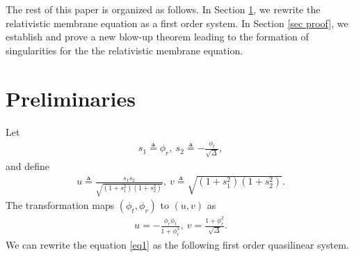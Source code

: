 \documentclass[10pt,leqno]{amsart}
\numberwithin{equation}{section}
\begin{document}
The rest of this paper is organized as follows. In Section \ref{sec pre}, we rewrite the relativistic membrane equation as a first order system. In Section \ref{sec proof}, we establish and prove a new blow-up theorem leading to the formation of singularities for the the relativistic membrane equation.











\section{Preliminaries} \label{sec pre}
Let
\begin{equation}\label{s1s2}
	\begin{aligned}
		s_{1}\triangleq\phi_{r} , \ s_{2}\triangleq-\frac{\phi_{t}}{\sqrt{\Delta}},
	\end{aligned}
\end{equation}
and define
\begin{equation}\label{uv}
	\begin{aligned}
		u\triangleq\frac{s_{1}s_{2}}{\sqrt{(1+s_{1}^{2})(1+s_{2}^{2})}}, \
		v\triangleq\sqrt{(1+s_{1}^{2})(1+s_{2}^{2})}.
	\end{aligned}
\end{equation}
The transformation maps $(\phi_{t},\phi_{r})$ to $(u,v)$ as
\begin{equation}\label{uv phi}
	\begin{aligned}
		u=-\frac{\phi_{r}\phi_{t}}{1+\phi_{r}^{2}}, \ 
		v=\frac{1+\phi_{r}^{2}}{\sqrt{\Delta}}.
	\end{aligned}
\end{equation}
We can rewrite the equation \eqref{eq1} as the following first order quasilinear system.
\end{document}
